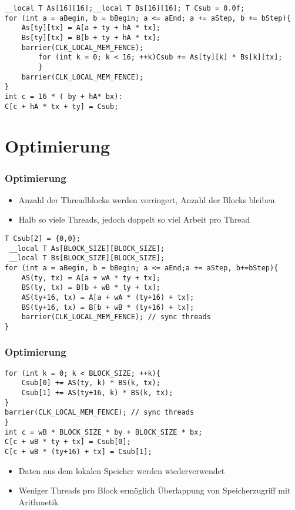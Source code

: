 \documentclass{beamer}
\begin{document}

\begin{frame}[fragile]
\begin{lstlisting}[style=customc,caption=NVIDIA-Snippet(2)]
__local T As[16][16];__local T Bs[16][16]; T Csub = 0.0f;
for (int a = aBegin, b = bBegin; a <= aEnd; a += aStep, b += bStep){ 
	As[ty][tx] = A[a + ty + hA * tx];
	Bs[ty][tx] = B[b + ty + hA * tx];
	barrier(CLK_LOCAL_MEM_FENCE);
		for (int k = 0; k < 16; ++k)Csub += As[ty][k] * Bs[k][tx];
		}
    barrier(CLK_LOCAL_MEM_FENCE);
}
int c = 16 * ( by + hA* bx):
C[c + hA * tx + ty] = Csub;
\end{lstlisting}


\end{frame}



\section{Optimierung}
\begin{frame}[fragile]
\frametitle{Optimierung}

\begin{itemize}
\item
Anzahl der Threadblocks werden verringert, Anzahl der Blocks bleiben
\item
Halb so viele Threads, jedoch doppelt so viel Arbeit pro Thread
\end{itemize}


\begin{lstlisting}[style=customc,caption=Optimized Code in OpenCL]
T Csub[2] = {0,0};
 __local T As[BLOCK_SIZE][BLOCK_SIZE]; 
 __local T Bs[BLOCK_SIZE][BLOCK_SIZE]; 
for (int a = aBegin, b = bBegin; a <= aEnd;a += aStep, b+=bStep){ 
	AS(ty, tx) = A[a + wA * ty + tx]; 
	BS(ty, tx) = B[b + wB * ty + tx]; 
	AS(ty+16, tx) = A[a + wA * (ty+16) + tx]; 
	BS(ty+16, tx) = B[b + wB * (ty+16) + tx]; 
	barrier(CLK_LOCAL_MEM_FENCE); // sync threads
}
\end{lstlisting}



\end{frame}


\begin{frame}[fragile]
\frametitle{Optimierung}
\begin{lstlisting}[style=customc,caption=innere Schleife und Output]
for (int k = 0; k < BLOCK_SIZE; ++k){ 
	Csub[0] += AS(ty, k) * BS(k, tx); 
	Csub[1] += AS(ty+16, k) * BS(k, tx); 
} 
barrier(CLK_LOCAL_MEM_FENCE); // sync threads
} 
int c = wB * BLOCK_SIZE * by + BLOCK_SIZE * bx; 
C[c + wB * ty + tx] = Csub[0]; 
C[c + wB * (ty+16) + tx] = Csub[1]; 
\end{lstlisting}

\begin{itemize}

\item
Daten aus dem lokalen Speicher werden wiederverwendet
\item 
Weniger Threads pro Block erm\"oglich \"Uberlappung von Speicherzugriff mit Arithmetik
\end{itemize}


\end{frame}
\end{document}
